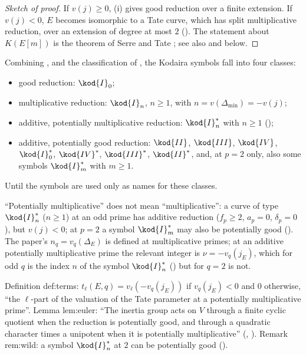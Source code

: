 \begin{proof}[Sketch of proof]
If $v(j)\ge0$, (i) gives good reduction over a finite extension. If
$v(j)<0$, $E$ becomes isomorphic to a Tate curve, which has split multiplicative reduction, over an extension
of degree at most $2$ (). The statement about $K(E[m])$ is the theorem of
Serre and Tate \cite[Section 2]{SerreTate68}; see also \cite[VII.5]{SilvermanAEC} and
 below.
\end{proof}

\begin{remark}\label{rem:reduction:types-of-the-four-cases}
Combining ,  and the classification of
, the Kodaira symbols fall into four classes:
\begin{itemize}
\item good reduction: $\kod{I}_0$;
\item multiplicative reduction: $\kod{I}_n$, $n\ge1$, with $n=v(\Delta_{\min})=-v(j)$;
\item additive, potentially multiplicative reduction: $\kod{I}_n^*$ with $n\ge1$ ();
\item additive, potentially good reduction: $\kod{II}$, $\kod{III}$, $\kod{IV}$, $\kod{I}_0^*$, $\kod{IV}^*$, $\kod{III}^*$, $\kod{II}^*$,
and, at $p=2$ only, also some symbols $\kod{I}_m^*$ with $m\ge1$.
\end{itemize}
Until  the symbols are used only as names for these classes.
\end{remark}

\begin{warning}\label{warn:reduction:potmult}
``Potentially multiplicative'' does not mean ``multiplicative'': a curve of type $\kod{I}_n^*$ ($n\ge1$) at an
odd prime has additive reduction ($f_p\ge2$, $a_p=0$, $\delta_p=0$), but $v(j)<0$; at $p=2$ a symbol $\kod{I}_m^*$ may also be
potentially good (). The paper's $n_q=v_q(\Delta_E)$ is defined at
multiplicative primes; at an additive potentially multiplicative prime the relevant integer is $\nu=-v_q(j_E)$,
which for odd $q$ is the index $n$ of the symbol $\kod{I}_n^*$ () but for
$q=2$ is not.
\end{warning}

\begin{paperlink}
Definition def:terms: $t_\ell(E,q)=v_\ell(-v_q(j_E))$ if $v_q(j_E)<0$ and $0$ otherwise, ``the $\ell$-part of the
valuation of the Tate parameter at a potentially multiplicative prime''. Lemma lem:euler: ``The inertia group acts
on $V$ through a finite cyclic quotient when the reduction is potentially good, and through a quadratic character
times a unipotent when it is potentially multiplicative'' (,
). Remark rem:wild: a symbol $\kod{I}_n^*$ at $2$ can be potentially good
().
\end{paperlink}

